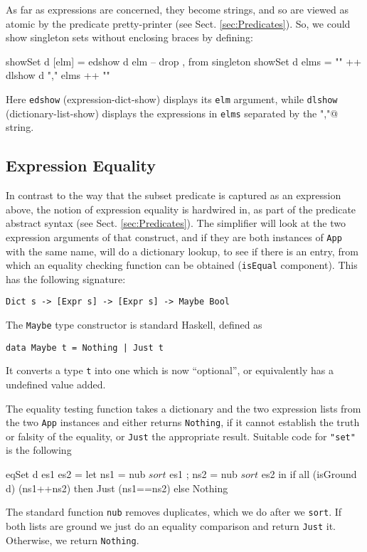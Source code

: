 As far as expressions are concerned,
they become strings, and so are viewed as atomic
by the predicate pretty-printer (see Sect. \ref{sec:Predicates}).
So, we could show singleton sets without enclosing braces
by defining:
\begin{code}
showSet d [elm] = edshow d elm   -- drop {,} from singleton
showSet d elms = "{" ++ dlshow d "," elms ++ "}"
\end{code}
Here \texttt{edshow} (expression-dict-show)
displays its \texttt{elm} argument,
while \texttt{dlshow} (dictionary-list-show) displays the expressions
in \texttt{elms} separated by the \verb@","@ string.


\subsection{Expression Equality}

In contrast to the way that the subset predicate
is captured as an expression above,
the notion of expression equality is hardwired in,
as part of the predicate abstract syntax (see Sect. \ref{sec:Predicates}).
The simplifier will look at the two expression
arguments of that construct,
and if they are both instances of \texttt{App} with the same name,
will do a dictionary lookup, to see if there
is an entry, from
which an equality checking function can be obtained (\texttt{isEqual} component).
This has the following signature:
\begin{verbatim}
Dict s -> [Expr s] -> [Expr s] -> Maybe Bool
\end{verbatim}
The \texttt{Maybe} type constructor is standard Haskell, defined as
\begin{verbatim}
data Maybe t = Nothing | Just t
\end{verbatim}
It converts a type \texttt{t} into one which is now ``optional'',
or equivalently has a undefined value added.

The equality testing function takes a dictionary and the two expression
lists from the two \texttt{App} instances
and either returns \texttt{Nothing},
if it cannot establish the truth or falsity of the equality,
or \texttt{Just} the appropriate result.
Suitable code for \verb$"set"$ is the following
\begin{code}
eqSet d es1 es2
 = let ns1 = nub $ sort $ es1 ; ns2 = nub $ sort $ es2
   in if all (isGround d) (ns1++ns2)
      then Just (ns1==ns2) else Nothing
\end{code}
The standard function \texttt{nub} removes duplicates,
which we do after we \texttt{sort}.
If both lists are ground we just do an equality comparison
and return \texttt{Just} it. Otherwise, we return \texttt{Nothing}.




